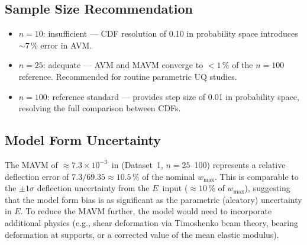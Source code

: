 \documentclass[11pt,letterpaper]{article}
\newcommand{\wmax}{w_{\max}}
\begin{document}
\subsection*{Sample Size Recommendation}

\begin{itemize}[nosep]
  \item $n = 10$: insufficient — CDF resolution of 0.10 in probability space
        introduces ${\sim}7\,\%$ error in AVM.
  \item $n = 25$: adequate — AVM and MAVM converge to $<\!1\,\%$ of the
        $n=100$ reference.  Recommended for routine parametric UQ studies.
  \item $n = 100$: reference standard — provides step size of 0.01 in
        probability space, resolving the full comparison between CDFs.
\end{itemize}

\subsection*{Model Form Uncertainty}

The MAVM of $\approx 7.3\times10^{-3}$~in (Dataset~1, $n=25$--100) represents a
relative deflection error of $7.3/69.35 \approx 10.5\,\%$ of the nominal $\wmax$.
This is comparable to the $\pm 1\sigma$ deflection uncertainty from the $E$~input
($\approx 10\,\%$ of $\wmax$), suggesting that the model form bias is as significant
as the parametric (aleatory) uncertainty in $E$.  To reduce the MAVM further,
the model would need to incorporate additional physics (e.g., shear deformation via
Timoshenko beam theory, bearing deformation at supports, or a corrected value
of the mean elastic modulus).
\end{document}
